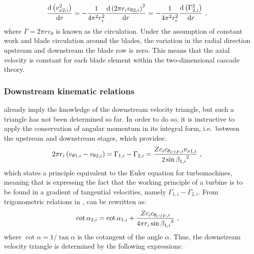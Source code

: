 \begin{equation}{\label{eq:radial_equilibrium_with_total_pressure}}
	\frac{\mathrm{d}\left(v_{x2,i}^{2}\right)}{\mathrm{d}r} = -\frac{1}{4\pi^{2}r_{i}^{2}}\frac{\mathrm{d}\left(2\pi{r_{i}}v_{\theta2,i}\right)^{2}}{\mathrm{d}r} = -\frac{1}{4\pi^{2}r_{i}^{2}}\frac{\mathrm{d}\left(\Gamma_{2,i}^{2}\right)}{\mathrm{d}r} \ ,
\end{equation}
where $\Gamma=2\pi{r}v_{\theta}$ is known as the circulation. Under the assumption of constant work and blade circulation around the blades, the variation in the radial direction upstream and downstream the blade row is zero. This means that the axial velocity is constant for each blade element within the two-dimensional cascade theory.
\subsubsection*{Downstream kinematic relations}{\label{subsubsec:downstream_kinematic_relations}}
 already imply the knowledge of the downstream velocity triangle, but such a triangle has not been determined so far. In order to do so, it is instructive to apply the conservation of angular momentum in its integral form, i.e.\ between the upstream and downstream stages, which provides:
\begin{equation}{\label{eq:angular_momentum_conservation}}
	2\pi{r_{i}}\left(v_{\theta1,i}-v_{\theta2,i}\right) = \Gamma_{1,i} - \Gamma_{2,i} = \frac{Zc_{i}c_{\theta_{CIF},i}v_{x1,i}}{2\sin{\beta_{1,i}}^{2}} \ ,
\end{equation}
which states a principle equivalent to the Euler equation for turbomachines, meaning that  is expressing the fact that the working principle of a turbine is to be found in a gradient of tangential velocities, namely $\Gamma_{1,i}-\Gamma_{2,i}$. From trigonometric relations in ,  can be rewritten as:
\begin{equation}{\label{eq:angular_momentum_conservation_cotangent_relation}}
\cot{\alpha_{2,i}} = \cot{\alpha_{1,i}} + \frac{Zc_{i}c_{\theta_{CIF},i}}{4\pi{r_{i}}\sin{\beta_{1,i}}^{2}} \ ,
\end{equation}
where $\cot{\alpha}=1/\tan{\alpha}$ is the cotangent of the angle $\alpha$. Thus, the downstream velocity triangle is determined by the following expressions:
